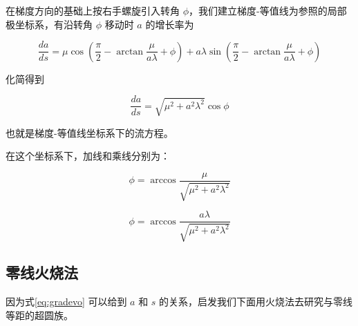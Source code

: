 \documentclass[a4paper,12pt]{article}
\numberwithin{definition}{section}
\numberwithin{lemma}{section}
\numberwithin{proposition}{section}
\numberwithin{theorem}{section}
\numberwithin{grammar}{section}
\numberwithin{program}{section}
\numberwithin{convention}{section}
\numberwithin{corollary}{section}
\begin{document}
在梯度方向的基础上按右手螺旋引入转角 $\phi$，我们建立梯度-等值线为参照的局部极坐标系，有沿转角 $\phi$ 移动时 $a$ 的增长率为

\begin{equation}
    \frac{da}{ds} = \mu \cos (\frac{\pi}{2} - \arctan \frac{\mu}{a \lambda} + \phi) + a \lambda \sin (\frac{\pi}{2} - \arctan \frac{\mu}{a \lambda} + \phi)
    \label{eq:fourfold}
\end{equation}

化简得到

\begin{equation}
    \frac{da}{ds} = \sqrt {\mu^2 + a^2 \lambda^2} \cos \phi\label{eq:contourgradient}
\end{equation}

也就是梯度-等值线坐标系下的流方程。

在这个坐标系下，加线和乘线分别为：

\begin{equation}
    \phi = \arccos \frac{\mu}{\sqrt {\mu^2 + a^2 \lambda^2}} \label{eq:additionalline}
\end{equation}

\begin{equation}
    \phi = \arccos \frac{a \lambda}{\sqrt {\mu^2 + a^2 \lambda^2}}\label {eq:mulitiplcativeline}
\end{equation}

\subsection{零线火烧法}

因为式\ref{eq:gradevo} 可以给到 $a$ 和 $s$ 的关系，启发我们下面用火烧法去研究与零线等距的超圆族。
\end{document}
